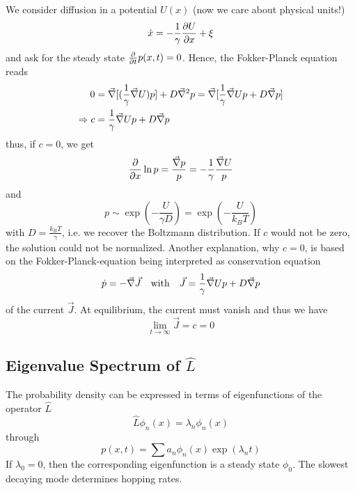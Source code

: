 \documentclass{/home/ben/Templates/notebook}
\begin{document}
	We consider diffusion in a potential $U(x)$ (now we care about physical units!)
	\begin{equation}
	\dot{x} = - \frac{1}{\gamma} \pdv{U}{x} + \xi
	\end{equation}
	and ask for the steady state $\pdv{t} p(x,t) = 0$. Hence, the Fokker-Planck equation reads
	\begin{align*}
		0 &= \vec{\nabla} [(\frac{1}{\gamma} \vec{\nabla} U) p] + D \vec{\nabla}^2 p 
		= \vec{\nabla} [\frac{1}{\gamma} \vec{\nabla} U p + D \vec{\nabla} p] \\
		\Rightarrow c &= \frac{1}{\gamma} \vec{\nabla} U p + D \vec{\nabla} p
	\end{align*}
	thus, if $c = 0$, we get
	\begin{equation}
	\pdv{x} \ln p = \frac{\vec{\nabla} p}{p} = - \frac{1}{\gamma} \frac{\vec{\nabla} U}{p}
	\end{equation}
	and 
	\begin{equation}
	p \sim \exp(-\frac{U}{\gamma D}) = \exp(-\frac{U}{k_B T})
	\end{equation}
	with $D = \frac{k_B T}{\gamma}$, i.e. we recover the Boltzmann distribution. If $c$ would not be zero, the solution could not be normalized. Another explanation, why $c = 0$, is based on the Fokker-Planck-equation being interpreted as conservation equation 
	\begin{equation}
	\dot{p} = - \vec{\nabla} \vec{J} \quad \mathrm{with} \quad \vec{J} = \frac{1}{\gamma} \vec{\nabla} U p + D \vec{\nabla} p
	\end{equation}
	of the current $\vec{J}$. At equilibrium, the current must vanish and thus we have
	\begin{equation}
	\lim_{t \to \infty} \vec{J} = c = 0
	\end{equation}
	
	\subsection*{Eigenvalue Spectrum of $\hat{L}$}
	
	The probability density can be expressed in terms of eigenfunctions of the operator $\hat{L}$
	\begin{equation}
	\hat{L} \phi_n(x) = \lambda_n \phi_n(x)
	\end{equation}
	through
	\begin{equation}
	p(x,t) = \sum a_n \phi_n(x) \exp(\lambda_n t)
	\end{equation}
	If $\lambda_0 = 0$, then the corresponding eigenfunction is a steady state $\phi_0$. The slowest decaying mode determines hopping rates.
	
\end{document}
